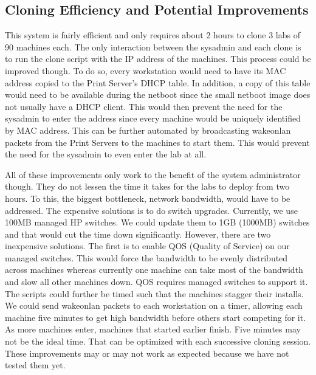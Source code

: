\subsection{Cloning Efficiency and Potential Improvements}
This system is fairly efficient and only requires about 2 hours to clone 3 labs of 90 machines each.  The only interaction between the sysadmin and each clone is to run the clone script with the IP address of the machines.  This process could be improved though.  To do so, every workstation would need to have its MAC address copied to the Print Server's DHCP table.  In addition, a copy of this table would need to be available during the netboot since the small netboot image does not usually have a DHCP client.  This would then prevent the need for the sysadmin to enter the address since every machine would be uniquely identified by MAC address.  This can be further automated by broadcasting wakeonlan packets from the Print Servers to the machines to start them.  This would prevent the need for the sysadmin to even enter the lab at all.  

All of these improvements only work to the benefit of the system administrator though.  They do not lessen the time it takes for the labs to deploy from two hours.  To this, the biggest bottleneck, network bandwidth, would have to be addressed.  The expensive solutions is to do switch upgrades.  Currently, we use 100MB managed HP switches.  We could update them to 1GB (1000MB) switches and that would cut the time down significantly.  However, there are two inexpensive solutions.  The first is to enable QOS (Quality of Service) on our managed switches.  This would force the bandwidth to be evenly distributed across machines whereas currently one machine can take most of the bandwidth and slow all other machines down.  QOS requires managed switches to support it.   The scripts could further be timed such that the machines stagger their installs.  We could send wakeonlan packets to each workstation on a timer, allowing each machine five minutes to get high bandwidth before others start competing for it.  As more machines enter, machines that started earlier finish.  Five minutes may not be the ideal time.  That can be optimized with each successive cloning session.  These improvements may or may not work as expected because we have not tested them yet.   

